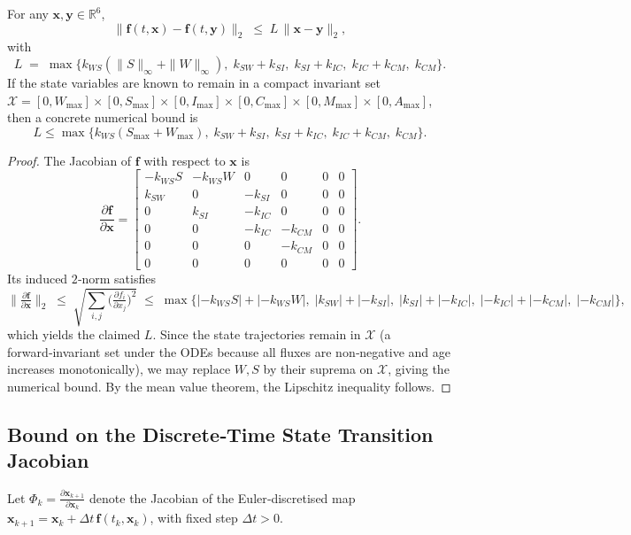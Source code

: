 \documentclass[11pt]{article}
\begin{document}
\begin{lemma}\label{lem:lipschitz}
For any $\bm{x},\bm{y}\in\mathbb{R}^{6}$,
\[
\bigl\|\bm{f}(t,\bm{x})-\bm{f}(t,\bm{y})\bigr\|_{2}
\;\le\;
L\,\|\bm{x}-\bm{y}\|_{2},
\]
with
\[
L \;=\; \max\bigl\{k_{WS}(\|S\|_{\infty}+\|W\|_{\infty}),\;
                k_{SW}+k_{SI},\;
                k_{SI}+k_{IC},\;
                k_{IC}+k_{CM},\;
                k_{CM}\bigr\}.
\]
If the state variables are known to remain in a compact invariant set
$\mathcal{X}=[0,W_{\max}]\times[0,S_{\max}]\times[0,I_{\max}]\times[0,C_{\max}]\times[0,M_{\max}]\times[0,A_{\max}]$,
then a concrete numerical bound is
\[
L \le \max\bigl\{k_{WS}(S_{\max}+W_{\max}),\;k_{SW}+k_{SI},\;k_{SI}+k_{IC},\;k_{IC}+k_{CM},\;k_{CM}\bigr\}.
\]
\end{lemma}
\begin{proof}
The Jacobian of $\bm{f}$ with respect to $\bm{x}$ is
\[
\frac{\partial\bm{f}}{\partial\bm{x}}
=
\begin{bmatrix}
 -k_{WS}S & -k_{WS}W & 0 & 0 & 0 & 0\\
  k_{SW}  & 0        &-k_{SI}& 0 & 0 & 0\\
  0       & k_{SI}   &-k_{IC}& 0 & 0 & 0\\
  0       & 0        &-k_{IC}&-k_{CM}&0&0\\
  0       & 0        & 0    &-k_{CM}&0&0\\
  0       & 0        & 0    & 0   &0&0
\end{bmatrix}.
\]
Its induced $2$‑norm satisfies
\[
\bigl\|\tfrac{\partial\bm{f}}{\partial\bm{x}}\bigr\|_{2}
\;\le\;
\sqrt{\sum_{i,j}\bigl(\tfrac{\partial f_i}{\partial x_j}\bigr)^{2}}
\;\le\;
\max\bigl\{|{-k_{WS}S}|+|{-k_{WS}W}|,\;|k_{SW}|+|{-k_{SI}}|,\;
          |k_{SI}|+|{-k_{IC}}|,\;|{-k_{IC}}|+|{-k_{CM}}|,\;|{-k_{CM}}|\bigr\},
\]
which yields the claimed $L$. Since the state trajectories remain in $\mathcal{X}$ (a forward‑invariant set under the ODEs because all fluxes are non‑negative and age increases monotonically), we may replace $W,S$ by their suprema on $\mathcal{X}$, giving the numerical bound. By the mean value theorem, the Lipschitz inequality follows.
\end{proof}

\subsection{Bound on the Discrete‑Time State Transition Jacobian}
\label{sub:disc_jac}

Let $\Phi_{k}=\frac{\partial\bm{x}_{k+1}}{\partial\bm{x}_{k}}$ denote the Jacobian of the Euler‑discretised map
$\bm{x}_{k+1}=\bm{x}_{k}+\Delta t\,\bm{f}(t_{k},\bm{x}_{k})$, with fixed step $\Delta t>0$.
\end{document}
